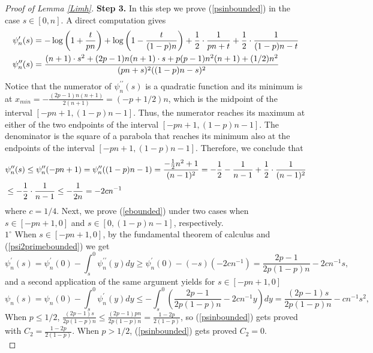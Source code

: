 \begin{proof}[Proof of Lemma \ref{Limh}]
\textbf{Step 3.} In this step we prove (\ref{psinbounded}) in the case $s\in[0,n]$. A direct computation gives
\begin{equation}{\label{CompDerivative}}
\begin{split}
	& \psi_{n}^{\prime}(s)=-\log\left(1+\frac{t}{pn}\right)+\log\left(1-\frac{t}{(1-p)n}\right)+\frac{1}{2}\cdot\frac{1}{pn+t}+\frac{1}{2}\cdot\frac{1}{(1-p)n-t}\\
	& \psi_{n}^{\prime\prime}(s)=\frac{(n+1)\cdot s^2+(2p-1)n(n+1)\cdot s+p(p-1)n^2(n+1)+(1/2)n^2}{(pn+s)^2((1-p)n-s)^2}
\end{split}
\end{equation}
Notice that the numerator of $\psi_{n}^{\prime\prime}(s)$ is a quadratic function and its minimum is at $x_{min}=-\frac{(2p-1)n(n+1)}{2(n+1)}=(-p+1/2)n$, which is the midpoint of the interval $[-pn+1,(1-p)n-1]$. Thus, the numerator reaches its maximum at either of the two endpoints of the interval $[-pn+1,(1-p)n-1]$. The denominator is the square of a parabola that reaches its minimum also at the endpoints of the interval $[-pn+1,(1-p)n-1]$. Therefore, we conclude that 
\begin{equation}{\label{psi2primebounded}}
\begin{split}
	& \psi_{n}^{\prime\prime}(s)\leq \psi_{n}^{\prime\prime}(-pn+1)=\psi_{n}^{\prime\prime}((1-p)n-1)=\frac{-\frac{1}{2}n^2+1}{(n-1)^2}=-\frac{1}{2} -\frac{1}{n-1}+\frac{1}{2}\cdot\frac{1}{(n-1)^2}\\
	& \leq -\frac{1}{2}\cdot\frac{1}{n-1}\leq -\frac{1}{2n}=-2cn^{-1}
\end{split}
\end{equation}
where $c=1/4$. Next, we prove (\ref{ebounded}) under two cases when $s\in[-pn+1,0]$ and $s\in [0,(1-p)n-1]$, respectively. \\
$1^{\circ}$ When $s\in[-pn+1,0]$, by the fundamental theorem of calculus and (\ref{psi2primebounded}) we get 
\begin{equation*}
	\psi_{n}^{\prime}(s)=\psi_{n}^{\prime}(0)-\int_{s}^{0}\psi_{n}^{\prime\prime}(y)dy\geq \psi_{n}^{\prime}(0)-(-s)(-2cn^{-1})=\frac{2p-1}{2p(1-p)n}-2cn^{-1}s,
\end{equation*}
and a second application of the same argument yields for $s\in[-pn+1,0]$
\begin{equation*}
	\psi_{n}(s)=\psi_{n}(0)-\int_{s}^{0}\psi_{n}^{\prime}(y)dy\leq -\int_{s}^{0}\left(\frac{2p-1}{2p(1-p)n}-2cn^{-1}y\right) dy=\frac{(2p-1)s}{2p(1-p)n}-cn^{-1}s^2,
\end{equation*}
When $p\leq 1/2$, $\frac{(2p-1)s}{2p(1-p)n}\leq \frac{(2p-1)pn}{2p(1-p)n}=\frac{1-2p}{2(1-p)}$, so (\ref{psinbounded}) gets proved with $C_{2}=\frac{1-2p}{2(1-p)}$. When $p>1/2$, (\ref{psinbounded}) gets proved $C_{2}=0$.\\

\end{proof}
